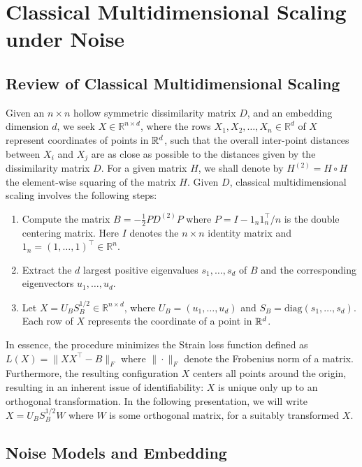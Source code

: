 \chapter{Classical Multidimensional Scaling under Noise}
\label{sec:dmcs}

\section{Review of Classical Multidimensional Scaling}
\label{sec:cmds} 
Given an $n \times n$ hollow symmetric dissimilarity
matrix $D$, and an embedding dimension $d$, we seek $X \in
\mathbb{R}^{n \times d}$, where the rows $X_1, X_2, \dots, X_n \in
\mathbb{R}^d$ of $X$ represent coordinates of points in ${\mathbb R}^d$, such
that the overall inter-point distances between $X_i$ and $X_j$ are
as close as possible to the distances given by the dissimilarity
matrix $D$. For a given matrix $H$, we shall denote by $H^{(2)} = H
\circ H$ the element-wise squaring of the matrix $H$.
Given $D$, classical multidimensional scaling 
involves the following steps:
\begin{enumerate}
  \item Compute the matrix $B = -\frac{1}{2}P D^{(2)} P$ where $P = I - 1_n1_n^{\top}/n$ is the double centering matrix. Here $I$
denotes the $n \times n$ identity matrix and $1_n = (1, \dots,
1)^\top \in \mathbb{R}^n$.
  \item Extract the $d$ largest positive eigenvalues $s_1, \dots, s_d$
of $B$ and the corresponding eigenvectors ${u}_1, \dots, u_d$.
  \item Let $X = U_B S_B^{1/2} \in \mathbb{R}^{n \times d}$, where
$U_B = (u_1, \dots, u_d)$ and $S_B = \textrm{diag}(s_1, \dots,
s_{d})$. Each row of $X$ represents the coordinate of a point in
${\mathbb R}^d$.
\end{enumerate} 
In essence, the procedure minimizes the Strain loss
function defined as $L(X) = \| XX^{\top} - B \|_{F}$ where
$\|\cdot\|_{F}$ denote the Frobenius norm of a matrix. Furthermore,
the resulting configuration ${X}$ centers all points around the origin, resulting in an inherent issue of identifiability: $X$ is
unique only up to an orthogonal transformation. In the following
presentation, we will write $X = U_B S_B^{1/2} W$ where $W$ is some
orthogonal matrix, for a suitably transformed $X$.

\section{Noise Models and Embedding}
